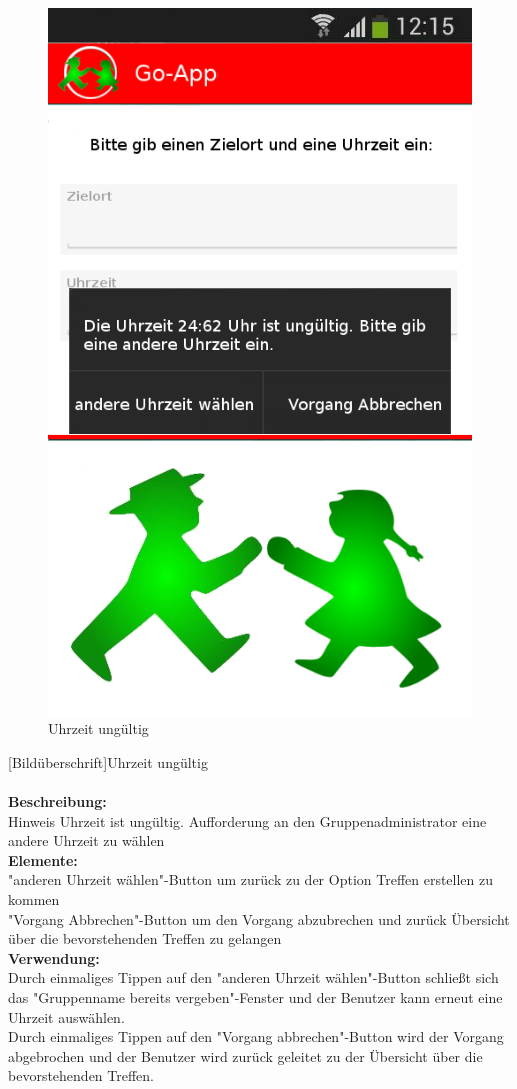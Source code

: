 \begin{figure} [H]
	\caption{Uhrzeit ungültig}
	\includegraphics[scale =0.5]{resources/images/treffpunkt_erstellen_ungueltig_Zeit.png}
\end{figure}
[Bildüberschrift]Uhrzeit ungültig\\ \\
\textbf{Beschreibung:}\\
Hinweis Uhrzeit ist ungültig. Aufforderung an den Gruppenadministrator eine andere Uhrzeit zu wählen\\
\textbf{Elemente:}\\
"anderen Uhrzeit wählen"-Button um zurück zu der Option Treffen erstellen zu kommen\\
"Vorgang Abbrechen"-Button um den Vorgang abzubrechen und zurück Übersicht über die bevorstehenden Treffen zu gelangen\\
\textbf{Verwendung:}\\
Durch einmaliges Tippen auf den "anderen Uhrzeit wählen"-Button schließt sich das "Gruppenname bereits vergeben"-Fenster und der Benutzer kann erneut eine Uhrzeit auswählen.\\
Durch einmaliges Tippen auf den "Vorgang abbrechen"-Button wird der Vorgang abgebrochen und der Benutzer wird zurück geleitet zu der Übersicht über die bevorstehenden Treffen.\\ \\

